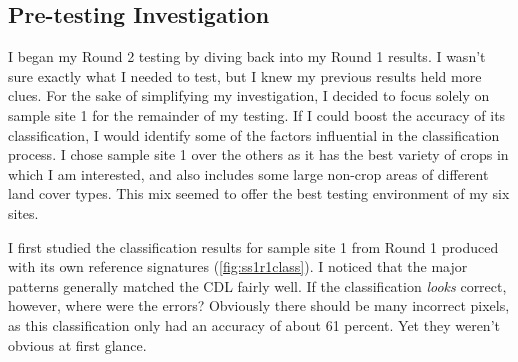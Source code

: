 \subsection*{Pre-testing Investigation}

I began my Round 2 testing by diving back into my Round 1 results. I wasn’t sure exactly what I needed to test, but I knew my previous results held more clues. For the sake of simplifying my investigation, I decided to focus solely on sample site 1 for the remainder of my testing. If I could boost the accuracy of its classification, I would identify some of the factors influential in the classification process. I chose sample site 1 over the others as it has the best variety of crops in which I am interested, and also includes some large non-crop areas of different land cover types. This mix seemed to offer the best testing environment of my six sites.

I first studied the classification results for sample site 1 from Round 1 produced with its own reference signatures (\autoref{fig:ss1r1class}). I noticed that the major patterns generally matched the CDL fairly well. If the classification \textit{looks} correct, however, where were the errors? Obviously there should be many incorrect pixels, as this classification only had an accuracy of about 61 percent. Yet they weren’t obvious at first glance.

